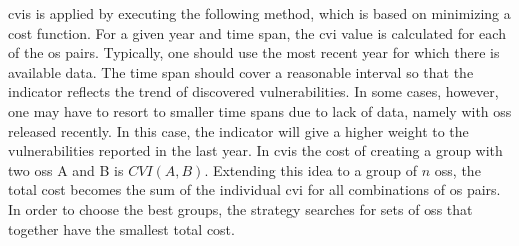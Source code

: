 \gls{cvis} is applied by executing the following method, which is based on minimizing a cost function. 
For a given year and time span, the \gls{cvi} value is calculated for each of the \gls{os} pairs. 
Typically, one should use the most recent year for which there is available data. 
The time span should cover a reasonable interval so that the indicator reflects the trend of discovered vulnerabilities. 
In some cases, however, one may have to resort to smaller time spans due to lack of data, namely with \glspl{os} released recently. 
In this case, the indicator will give a higher weight to the vulnerabilities reported in the last year. 
In \gls{cvis} the cost of creating a group with two \glspl{os} A and B is $\mathit{CVI}(A,B)$. 
Extending this idea to a group of $n$ \glspl{os}, the total cost becomes the sum of the individual \gls{cvi} for all combinations of \gls{os} pairs.
In order to choose the best groups, the strategy searches for sets of \glspl{os} that together have the smallest total cost.


